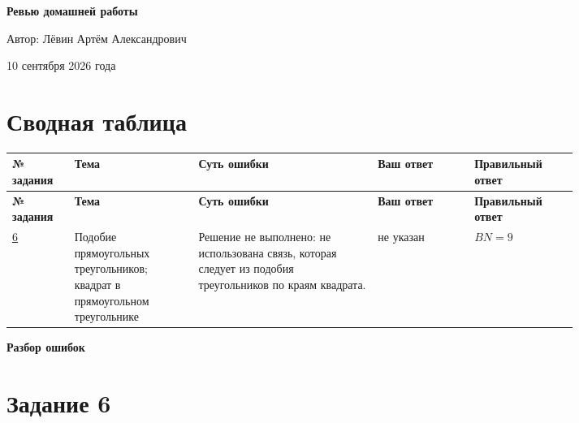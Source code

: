 \documentclass[12pt,a4paper]{article}
\begin{document}
\begin{titlepage}
\thispagestyle{empty}
\begin{center}
\vspace*{0.24\textheight}
{\Huge\bfseries Ревью домашней работы\par}
\vspace{2.2cm}
{\Large Автор: Лёвин Артём Александрович\par}
\vspace{1.0cm}
{\large 10 сентября 2026 года\par}
\end{center}
\vfill
\begin{center}
\end{center}
\end{titlepage}

\newpage
\section*{Сводная таблица}
\footnotesize
\setlength{\tabcolsep}{4pt}
\begin{longtable}{>{\centering\arraybackslash}p{0.08\linewidth}p{0.18\linewidth}p{0.26\linewidth}p{0.14\linewidth}p{0.15\linewidth}}
\toprule
\textbf{№ задания} & \textbf{Тема} & \textbf{Суть ошибки} & \textbf{Ваш ответ} & \textbf{Правильный ответ} \\
\midrule
\endfirsthead
\toprule
\textbf{№ задания} & \textbf{Тема} & \textbf{Суть ошибки} & \textbf{Ваш ответ} & \textbf{Правильный ответ} \\
\midrule
\endhead
\hyperref[task:6]{6} & Подобие прямоугольных треугольников; квадрат в прямоугольном треугольнике & Решение не выполнено: не использована связь, которая следует из подобия треугольников по краям квадрата. & не указан & $BN=9$ \\
\bottomrule
\end{longtable}
\normalsize

\newpage
\null\vfill
\begin{center}
{\LARGE\bfseries Разбор ошибок}
\end{center}
\vfill\null
\newpage

\label{task:6}
\section*{Задание 6}
\end{document}
